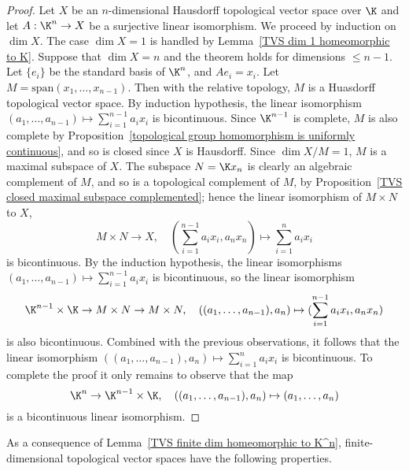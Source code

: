 \begin{proof}
Let $X$ be an $n$-dimensional Hausdorff topological vector space over $\K$ and let $A:\K^n\to X$ be a surjective linear isomorphism. We proceed by induction on $\dim X$. The case $\dim X=1$ is handled by Lemma~\ref{TVS dim 1 homeomorphic to K}. Suppose that $\dim X=n$ and the theorem holds for dimensions $\leq n-1$. Let $\{e_i\}$ be the standard basis of $\K^n$, and $Ae_i=x_i$. Let $M=\mathrm{span}(x_1,\dots,x_{n-1})$. Then with the relative topology, $M$ is a Huasdorff topological vector space. By induction hypothesis, the linear isomorphism $(a_1,\dots,a_{n-1})\mapsto\sum_{i=1}^{n-1}a_ix_i$ is bicontinuous. Since $\K^{n-1}$ is complete, $M$ is also complete by Proposition~\ref{topological group homomorphism is uniformly continuous}, and so is closed since $X$ is Hausdorff. Since $\dim X/M=1$, $M$ is a maximal subspace of $X$. The subspace $N=\K x_n$ is clearly an algebraic complement of $M$, and so is a topological complement of $M$, by Proposition~\ref{TVS closed maximal subspace complemented}; hence the linear isomorphism of $M\times N$ to $X$,
\[M\times N\to X,\quad (\sum_{i=1}^{n-1}a_ix_i,a_nx_n)\mapsto\sum_{i=1}^{n}a_ix_i\]
is bicontinuous. By the induction hypothesis, the linear isomorphisms $(a_1,\dots,a_{n-1})\mapsto\sum_{i=1}^{n-1}a_ix_i$ is bicontinuous, so the linear isomorphism
\[\K^{n-1}\times\K\to M\times N\to M\times N,\quad ((a_1,\dots,a_{n-1}),a_n)\mapsto (\sum_{i=1}^{n-1}a_ix_i,a_nx_n)\]
is also bicontinuous. Combined with the previous observations, it follows that the linear isomorphism $((a_1,\dots,a_{n-1}),a_n)\mapsto\sum_{i=1}^{n}a_ix_i$ is bicontinuous. To complete the proof it only remains to observe that the map
\[\K^n\to\K^{n-1}\times\K,\quad ((a_1,\dots,a_{n-1}),a_n)\mapsto(a_1,\dots,a_n)\]
is a bicontinuous linear isomorphism.
\end{proof}
As a consequence of Lemma~\ref{TVS finite dim homeomorphic to K^n}, finite-dimensional topological vector spaces have the following properties.
